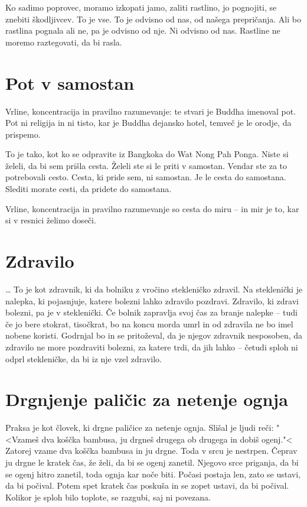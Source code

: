 Ko sadimo poprovec, moramo izkopati jamo, zaliti rastlino, jo pognojiti, se znebiti škodljivcev. To je vse. To je odvisno od nas, od našega prepričanja. Ali bo rastlina pognala ali ne, pa je odvisno od nje. Ni odvisno od nas. Rastline ne moremo raztegovati, da bi rasla.

\section{Pot v samostan}

Vrline, koncentracija in pravilno razumevanje: te stvari je Buddha imenoval pot. Pot ni religija in ni tisto, kar je Buddha dejansko hotel, temveč je le orodje, da prispemo.

To je tako, kot ko se odpravite iz Bangkoka do Wat Nong Pah Ponga. Niste si želeli, da bi sem prišla cesta. Želeli ste si le priti v samostan. Vendar ste za to potrebovali cesto. Cesta, ki pride sem, ni samostan. Je le cesta do samostana. Slediti morate cesti, da pridete do samostana.

Vrline, koncentracija in pravilno razumevanje so cesta do miru – in mir je to, kar si v resnici želimo doseči.

\section{Zdravilo}

\ldots{} To je kot zdravnik, ki da bolniku z vročino stekleničko zdravil. Na steklenički je nalepka, ki pojasnjuje, katere bolezni lahko zdravilo pozdravi. Zdravilo, ki zdravi bolezni, pa je v steklenički. Če bolnik zapravlja svoj čas za branje nalepke – tudi če jo bere stokrat, tisočkrat, bo na koncu morda umrl in od zdravila ne bo imel nobene koristi. Godrnjal bo in se pritoževal, da je njegov zdravnik nesposoben, da zdravilo ne more pozdraviti bolezni, za katere trdi, da jih lahko – četudi sploh ni odprl stekleničke, da bi iz nje vzel zdravilo.

\section{Drgnjenje paličic za netenje ognja}

Praksa je kot človek, ki drgne paličice za netenje ognja. Slišal je ljudi reči: "<Vzameš dva koščka bambusa, ju drgneš drugega ob drugega in dobiš ogenj."< Zatorej vzame dva koščka bambusa in ju drgne. Toda v srcu je nestrpen. Čeprav ju drgne le kratek čas, že želi, da bi se ogenj zanetil. Njegovo srce priganja, da bi se ogenj hitro zanetil, toda ognja kar noče biti. Počasi postaja len, zato se ustavi, da bi počival. Potem spet kratek čas poskuša in se zopet ustavi, da bi počival. Kolikor je sploh bilo toplote, se razgubi, saj ni povezana.

